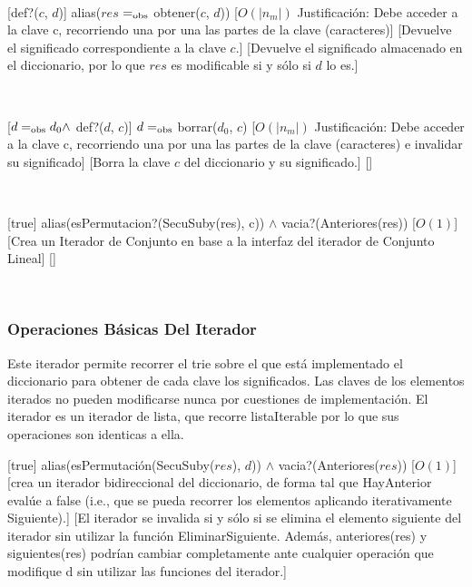 ~

[def?($c$, $d$)]
{alias($res$ $=_{\mathrm{obs}}$ obtener($c$, $d$))}
[$O(|n_m|)$ Justificación: Debe acceder a la clave c, recorriendo una por una las partes de la clave (caracteres)]
[Devuelve el significado correspondiente a la clave $c$.]
[Devuelve el significado almacenado en el diccionario, por lo que $res$ es modificable si y sólo si $d$ lo es.]

~

[$ d =_{\mathrm{obs}} d_0 \land $ def?($d$, $c$)]
{$ d =_{\mathrm{obs}}$ borrar($d_0$, $c$)}
[$O(|n_m|)$ Justificación: Debe acceder a la clave c, recorriendo una por una las partes de la clave (caracteres) e invalidar su significado]
[Borra la clave $c$ del diccionario y su significado.]
[]

~

[true]
{alias(esPermutacion?(SecuSuby(res), c)) $\land$ vacia?(Anteriores(res))}
[$O(1)$]
[Crea un Iterador de Conjunto en base a la interfaz del iterador de Conjunto Lineal]
[]

~
\subsubsection{Operaciones Básicas Del Iterador}

Este iterador permite recorrer el trie sobre el que est\'{a} implementado el diccionario para obtener de cada clave los significados. Las claves de los elementos iterados no
pueden modificarse nunca por cuestiones de implementación. El iterador es un iterador de lista, que recorre listaIterable por lo que sus operaciones son identicas a ella.

[true]
{alias(esPermutación(SecuSuby($res$), $d$)) $\land$ vacia?(Anteriores($res$))}
[$O(1)$]
[crea un iterador bidireccional del diccionario, de forma tal que HayAnterior evalúe a false (i.e.,
que se pueda recorrer los elementos aplicando iterativamente Siguiente).]
[El iterador se invalida si y sólo si se elimina el elemento siguiente del iterador sin utilizar la función
EliminarSiguiente. Además, anteriores(res) y siguientes(res) podrían cambiar completamente ante cualquier
operación que modifique d sin utilizar las funciones del iterador.]

~


